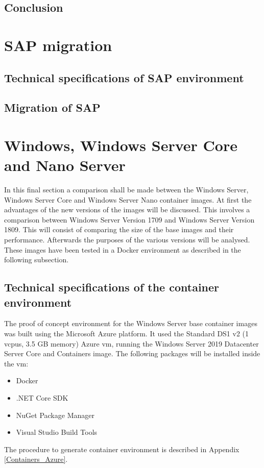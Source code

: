 \subsection{Conclusion}
\section{SAP migration}
\subsection{Technical specifications of SAP environment}
\subsection{Migration of SAP}
\section{Windows, Windows Server Core and Nano Server}
In this final section a comparison shall be made between the Windows Server, Windows Server Core and Windows Server Nano container images. At first the advantages of the new versions of the images will be discussed. This involves a comparison between Windows Server Version 1709 and Windows Server Version 1809. This will consist of comparing the size of the base images and their performance. Afterwards the purposes of the various versions will be analysed. These images have been tested in a Docker environment as described in the following subsection.

\subsection{Technical specifications of the container environment}
The proof of concept environment for the Windows Server base container images was built using the Microsoft Azure platform. It used the Standard DS1 v2 (1 vcpus, 3.5 GB memory) Azure \acrshort{vm}, running the Windows Server 2019 Datacenter Server Core and Containers image.
The following packages will be installed inside the \acrshort{vm}:
\begin{itemize}
	\item Docker
	\item .NET Core SDK
	\item NuGet Package Manager
	\item Visual Studio Build Tools  
\end{itemize}
The procedure to generate container environment is described in Appendix \ref{Containers_Azure}.

